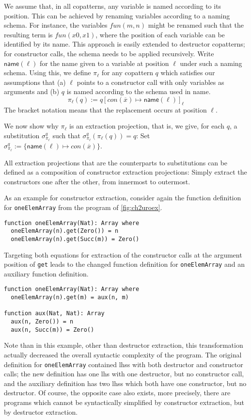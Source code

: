 We assume that, in all copatterns, any variable is named according to its position. This can be  achieved by renaming variables according to a naming schema. For instance, the variables $fun(m, n)$ might be renamed such that the resulting term is $fun(x0, x1)$, where the position of each variable can be identified by its name. This approach is easily extended to destructor copatterns; for constructor calls, the schema needs to be applied recursively. Write $\textsf{name}(\ell)$ for the name given to a variable at position $\ell$ under such a naming schema. Using this, we define $\pi_\ell$ for any copattern $q$ which satisfies our assumptions that (a) $\ell$ points to a constructor call with only variables as arguments and (b) $q$ is named according to the schema used in \textsf{name}.
\[
\pi_\ell(q) := q[con(\overline{x}) \mapsto \textsf{name}(\ell)]_\ell
\]
The bracket notation means that the replacement occurs at position $\ell$.

We now show why $\pi_\ell$ is an extraction projection, that is, we give, for each $q$, a substitution $\sigma^q_{\pi_\ell}$ such that $\sigma^q_{\pi_\ell}(\pi_\ell(q)) = q$: Set $\sigma^q_{\pi_\ell} := \{\textsf{name}(\ell) \mapsto con(\overline{x})\}$.

All extraction projections that are the counterparts to substitutions can be defined as a composition of constructor extraction projections: Simply extract the constructors one after the other, from innermost to outermost.

As an example for constructor extraction, consider again the function definition for \texttt{oneElemArray} from the program of \autoref{fig:ch2uroex}.
\begin{lstlisting}
function oneElemArray(Nat): Array where
  oneElemArray(n).get(Zero()) = n
  oneElemArray(n).get(Succ(m)) = Zero()
\end{lstlisting}
Targeting both equations for extraction of the constructor calls at the argument position of \texttt{get} leads to the changed function definition for \texttt{oneElemArray} and an auxiliary function definition.
\begin{lstlisting}
function oneElemArray(Nat): Array where
  oneElemArray(n).get(m) = aux(n, m)

function aux(Nat, Nat): Array
  aux(n, Zero()) = n
  aux(n, Succ(m)) = Zero()
\end{lstlisting}
Note than in this example, other than destructor extraction, this transformation actually decreased the overall syntactic complexity of the program. The original definition for \texttt{oneElemArray} contained lhss with both destructor and constructor calls; the new definition has one lhs with one destructor, but no constructor call, and the auxiliary definition has two lhss which both have one constructor, but no destructor. Of course, the opposite case also exists, more precisely, there are programs which cannot be syntactically simplified by constructor extraction, but by destructor extraction.

